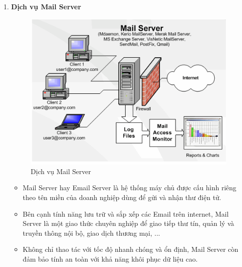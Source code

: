 \documentclass[13pt]{article}
\begin{document}
\begin{enumerate}
    \item \textbf{Dịch vụ Mail Server}
    \begin{figure}[h!]
        \centering
        \includegraphics[width=0.7\linewidth]{image/5.png}
            \caption{Dịch vụ Mail Server}
            \label{fig:label1}
    \end{figure}
    
    \begin{itemize}
        \item Mail Server hay Email Server là hệ thống máy chủ được cấu hình riêng theo tên miền của doanh nghiệp dùng để gửi và nhận thư điện tử. 
        \item Bên cạnh tính năng lưu trữ và sắp xếp các Email trên internet, Mail Server là một giao thức chuyên nghiệp để giao tiếp thư tín, quản lý và truyền thông nội bộ, giao dịch thương mại, ... 
        \item Không chỉ thao tác với tốc độ nhanh chóng và ổn định, Mail Server còn đảm bảo tính an toàn với khả năng khôi phục dữ liệu cao.
    \end{itemize}
    
\end{enumerate}
\end{document}
